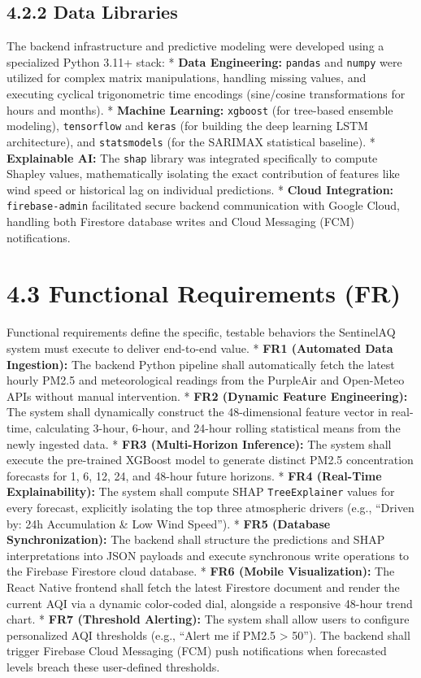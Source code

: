 \subsection{4.2.2 Data Libraries}\label{data-libraries}

The backend infrastructure and predictive modeling were developed using
a specialized Python 3.11+ stack: * \textbf{Data Engineering:}
\texttt{pandas} and \texttt{numpy} were utilized for complex matrix
manipulations, handling missing values, and executing cyclical
trigonometric time encodings (sine/cosine transformations for hours and
months). * \textbf{Machine Learning:} \texttt{xgboost} (for tree-based
ensemble modeling), \texttt{tensorflow} and \texttt{keras} (for building
the deep learning LSTM architecture), and \texttt{statsmodels} (for the
SARIMAX statistical baseline). * \textbf{Explainable AI:} The
\texttt{shap} library was integrated specifically to compute Shapley
values, mathematically isolating the exact contribution of features like
wind speed or historical lag on individual predictions. * \textbf{Cloud
Integration:} \texttt{firebase-admin} facilitated secure backend
communication with Google Cloud, handling both Firestore database writes
and Cloud Messaging (FCM) notifications.

\section{4.3 Functional Requirements
(FR)}\label{functional-requirements-fr}

Functional requirements define the specific, testable behaviors the
SentinelAQ system must execute to deliver end-to-end value. *
\textbf{FR1 (Automated Data Ingestion):} The backend Python pipeline
shall automatically fetch the latest hourly PM2.5 and meteorological
readings from the PurpleAir and Open-Meteo APIs without manual
intervention. * \textbf{FR2 (Dynamic Feature Engineering):} The system
shall dynamically construct the 48-dimensional feature vector in
real-time, calculating 3-hour, 6-hour, and 24-hour rolling statistical
means from the newly ingested data. * \textbf{FR3 (Multi-Horizon
Inference):} The system shall execute the pre-trained XGBoost model to
generate distinct PM2.5 concentration forecasts for 1, 6, 12, 24, and
48-hour future horizons. * \textbf{FR4 (Real-Time Explainability):} The
system shall compute SHAP \texttt{TreeExplainer} values for every
forecast, explicitly isolating the top three atmospheric drivers (e.g.,
``Driven by: 24h Accumulation \& Low Wind Speed''). * \textbf{FR5
(Database Synchronization):} The backend shall structure the predictions
and SHAP interpretations into JSON payloads and execute synchronous
write operations to the Firebase Firestore cloud database. * \textbf{FR6
(Mobile Visualization):} The React Native frontend shall fetch the
latest Firestore document and render the current AQI via a dynamic
color-coded dial, alongside a responsive 48-hour trend chart. *
\textbf{FR7 (Threshold Alerting):} The system shall allow users to
configure personalized AQI thresholds (e.g., ``Alert me if PM2.5
\textgreater{} 50''). The backend shall trigger Firebase Cloud Messaging
(FCM) push notifications when forecasted levels breach these
user-defined thresholds.

